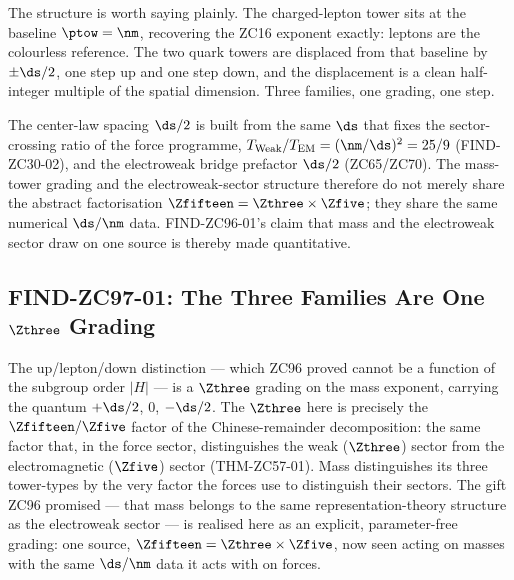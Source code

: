 \documentclass[12pt, a4paper]{article}
\begin{document}
The structure is worth saying plainly. The charged-lepton tower sits at the
baseline $\ptow=\nm$, recovering the ZC16 exponent exactly: leptons are the
colourless reference. The two quark towers are displaced from that baseline by
$\pm\ds/2$, one step up and one step down, and the displacement is a clean
half-integer multiple of the spatial dimension. Three families, one grading,
one step.

\begin{formalbox}[title={COR-ZC97-01: The Spacing Is the Sector $\ds$}]
The center-law spacing $\ds/2$ is built from the same $\ds$ that fixes the
sector-crossing ratio of the force programme,
$T_{\mathrm{Weak}}/T_{\mathrm{EM}}=(\nm/\ds)^2=25/9$ (FIND-ZC30-02), and the
electroweak bridge prefactor $\ds/2$ (ZC65/ZC70). The mass-tower grading and the
electroweak-sector structure therefore do not merely share the abstract
factorisation $\Zfifteen=\Zthree\times\Zfive$; they share the same numerical
$\ds/\nm$ data. FIND-ZC96-01's claim that mass and the electroweak sector draw
on one source is thereby made quantitative.
\end{formalbox}


\subsection{FIND-ZC97-01: The Three Families Are One \texorpdfstring{$\Zthree$}{Z3} Grading}
\label{sec:gift-zc97}

\begin{giftbox}[title={FIND-ZC97-01: A $\Zthree$ Grading on the Mass Exponent}]
The up/lepton/down distinction --- which ZC96 proved cannot be a function of the
subgroup order $|H|$ --- is a $\Zthree$ grading on the mass exponent, carrying
the quantum $+\ds/2$, $0$, $-\ds/2$. The $\Zthree$ here is precisely the
$\Zfifteen/\Zfive$ factor of the Chinese-remainder decomposition: the same
factor that, in the force sector, distinguishes the weak ($\Zthree$) sector from
the electromagnetic ($\Zfive$) sector (THM-ZC57-01). Mass distinguishes its
three tower-types by the very factor the forces use to distinguish their
sectors. The gift ZC96 promised --- that mass belongs to the same
representation-theory structure as the electroweak sector --- is realised here
as an explicit, parameter-free grading: one source, $\Zfifteen=\Zthree\times
\Zfive$, now seen acting on masses with the same $\ds/\nm$ data it acts with on
forces.
\end{giftbox}
\end{document}
